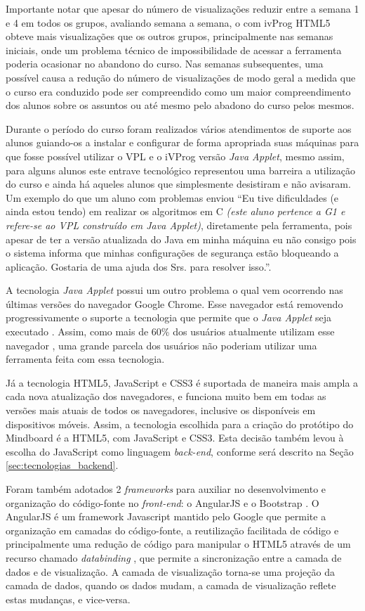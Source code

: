 Importante notar que apesar do número de visualizações reduzir entre a semana 1 e 4 em todos os grupos, avaliando semana a semana, o com ivProg HTML5 obteve mais visualizações que os outros grupos, principalmente nas semanas iniciais, onde um problema técnico de impossibilidade de acessar a ferramenta poderia ocasionar no abandono do curso. Nas semanas subsequentes, uma possível causa a redução do número de visualizações de modo geral a medida que o curso era conduzido pode ser compreendido como um maior compreendimento dos alunos sobre os assuntos ou até mesmo pelo abadono do curso pelos mesmos.

Durante o período do curso foram realizados vários atendimentos de suporte aos alunos guiando-os a instalar e configurar de forma apropriada suas máquinas para que fosse possível utilizar o VPL e o iVProg versão \emph{Java Applet}, mesmo assim, para alguns alunos este entrave tecnológico representou uma barreira a utilização do curso e ainda há aqueles alunos que simplesmente desistiram e não avisaram. Um exemplo do que um aluno com problemas enviou ``Eu tive dificuldades (e ainda estou tendo) em realizar os algoritmos em C \emph{(este aluno pertence a G1 e refere-se ao VPL construído em Java Applet)}, diretamente pela ferramenta, pois apesar de ter a versão atualizada do Java em minha máquina eu não consigo pois o sistema informa que minhas configurações de segurança estão bloqueando a aplicação. Gostaria de uma ajuda dos Srs. para resolver isso.''. 

A tecnologia \emph{Java Applet} possui um outro problema o qual vem ocorrendo nas últimas versões do navegador Google Chrome. Esse navegador está removendo progressivamente o suporte a tecnologia que permite que o \emph{Java Applet} seja executado \cite{java_chrome}. Assim, como mais de 60\% dos usuários atualmente utilizam esse navegador \cite{browser_stats}, uma grande parcela dos usuários não poderiam utilizar uma ferramenta feita com essa tecnologia.

Já a tecnologia HTML5, JavaScript e CSS3 é suportada de maneira mais ampla a cada nova atualização dos navegadores, e funciona muito bem em todas as versões mais atuais de todos os navegadores, inclusive os disponíveis em dispositivos móveis. Assim, a tecnologia escolhida para a criação do protótipo do Mindboard é a HTML5, com JavaScript e CSS3. Esta decisão também levou à escolha do JavaScript como linguagem \emph{back-end}, conforme será descrito na Seção \ref{sec:tecnologias_backend}.

Foram também adotados 2 \emph{frameworks} para auxiliar no desenvolvimento e organização do código-fonte no \emph{front-end}: o AngularJS \cite{angularjs} e o Bootstrap \cite{bootstrap}. O AngularJS é um framework Javascript mantido pelo Google que permite a organização em camadas do código-fonte, a reutilização facilitada de código e principalmente uma redução de código para manipular o HTML5 através de um recurso chamado \emph{databinding} \cite{databinding}, que permite a sincronização entre a camada de dados e de visualização. A camada de visualização torna-se uma projeção da camada de dados, quando os dados mudam, a camada de visualização reflete estas mudanças, e vice-versa.

